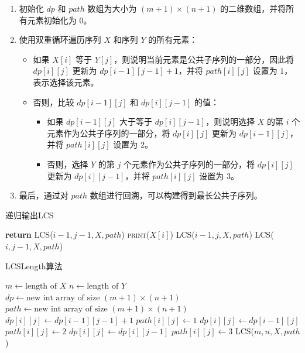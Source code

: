 \documentclass[lang=cn,11pt,a4paper]{elegantpaper}
\begin{document}
\begin{enumerate}
  \item 初始化 $dp$ 和 $path$ 数组为大小为 $(m+1) \times (n+1)$ 的二维数组，并将所有元素初始化为 $0$。
  \item 使用双重循环遍历序列 $X$ 和序列 $Y$ 的所有元素：
    \begin{itemize}
      \item 如果 $X[i]$ 等于 $Y[j]$，则说明当前元素是公共子序列的一部分，因此将 $dp[i][j]$ 更新为 $dp[i-1][j-1] + 1$，并将 $path[i][j]$ 设置为 $1$，表示选择该元素。
      \item 否则，比较 $dp[i-1][j]$ 和 $dp[i][j-1]$ 的值：
        \begin{itemize}
          \item 如果 $dp[i-1][j]$ 大于等于 $dp[i][j-1]$，则说明选择 $X$ 的第 $i$ 个元素作为公共子序列的一部分，将 $dp[i][j]$ 更新为 $dp[i-1][j]$，并将 $path[i][j]$ 设置为 $2$。
          \item 否则，选择 $Y$ 的第 $j$ 个元素作为公共子序列的一部分，将 $dp[i][j]$ 更新为 $dp[i][j-1]$，并将 $path[i][j]$ 设置为 $3$。
        \end{itemize}
    \end{itemize}
  \item 最后，通过对 $path$ 数组进行回溯，可以构建得到最长公共子序列。
\end{enumerate}

\begin{algorithm}[H]
\caption{递归输出LCS}
\begin{algorithmic}[1]
        \State \textbf{return}
    \EndIf
        \State \textsc{LCS}($i - 1, j - 1, X, path$)
        \State \textsc{print}($X[i]$)
        \State \textsc{LCS}($i - 1, j, X, path$)
    \Else
        \State \textsc{LCS}($i, j - 1, X, path$)
    \EndIf
\EndProcedure
\end{algorithmic}
\end{algorithm}

\begin{algorithm}[H]
\caption{LCSLength算法}
\begin{algorithmic}[1]
    \State $m \gets \text{length of } X$
    \State $n \gets \text{length of } Y$
    \State $dp \gets \text{new int array of size } (m + 1) \times (n + 1)$ 
    \State $path \gets \text{new int array of size } (m + 1) \times (n + 1)$ 
                \State $dp[i][j] \gets dp[i - 1][j - 1] + 1$
                \State $path[i][j] \gets 1$
                \State $dp[i][j] \gets dp[i - 1][j]$
                \State $path[i][j] \gets 2$
            \Else
                \State $dp[i][j] \gets dp[i][j - 1]$
                \State $path[i][j] \gets 3$
            \EndIf
        \EndFor
    \EndFor
    \State \textsc{LCS}($m, n, X, path$)
\EndProcedure
\end{algorithmic}
\end{algorithm}
\end{document}
